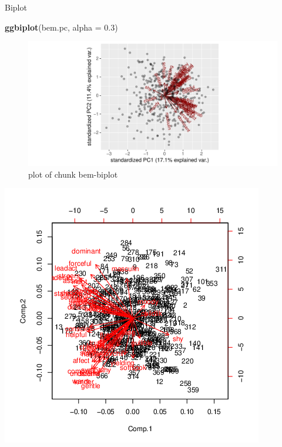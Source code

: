 \documentclass[ignorenonframetext,]{beamer}
\newenvironment{Shaded}{\begin{snugshade}}{\end{snugshade}}
\newcommand{\DataTypeTok}[1]{\textcolor[rgb]{0.13,0.29,0.53}{#1}}
\newcommand{\FloatTok}[1]{\textcolor[rgb]{0.00,0.00,0.81}{#1}}
\newcommand{\KeywordTok}[1]{\textcolor[rgb]{0.13,0.29,0.53}{\textbf{#1}}}
\newcommand{\NormalTok}[1]{#1}
\begin{document}
\begin{frame}[fragile]{Biplot}
\protect\hypertarget{biplot-4}{}

\begin{Shaded}
\begin{Highlighting}[]
\KeywordTok{ggbiplot}\NormalTok{(bem.pc, }\DataTypeTok{alpha =} \FloatTok{0.3}\NormalTok{)}
\end{Highlighting}
\end{Shaded}

\begin{figure}
\centering
\includegraphics{figure/bem-biplot-1.pdf}
\caption{plot of chunk bem-biplot}
\end{figure}

\includegraphics{bFactor-bem-biplot.png}

\end{frame}
\end{document}
